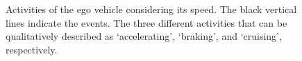 \begin{figure}
	\centering
	\setlength\figureheight{130pt}
	\setlength\figurewidth{248pt}
	\caption{Activities of the ego vehicle considering its speed. The black vertical lines indicate the events. The three different activities that can be qualitatively described as `accelerating', `braking', and `cruising', respectively.}
	\label{fig:example ego states}
	\spaceaftercaption
\end{figure}



%	

